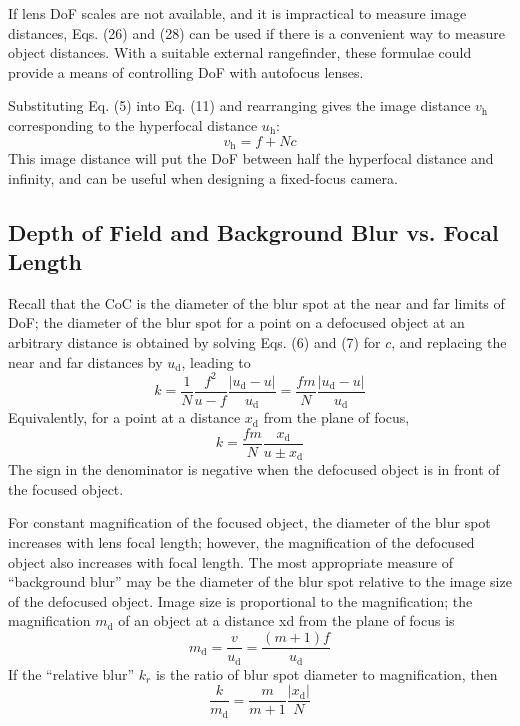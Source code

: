 \documentclass[11pt, oneside]{scrartcl}   	%
\begin{document}
If lens DoF scales are not available, and it is impractical to measure image distances, Eqs. (26) and (28) can be used if there is a convenient way to measure object distances. With a suitable external rangefinder, these formulae could provide a means of controlling DoF with autofocus lenses.

Substituting Eq. (5) into Eq. (11) and rearranging gives the image distance $v_\mathrm{h}$ corresponding to the hyperfocal distance $u_\mathrm{h}$:
\begin{equation}
   v_\mathrm{h} = f + N\!c
   \label{eq:vh} 
\end{equation}
This image distance will put the DoF between half the hyperfocal distance and infinity, and
can be useful when designing a fixed-focus camera.

\subsection{Depth of Field and Background Blur vs. Focal Length}

Recall that the CoC is the diameter of the blur spot at the near and far limits of DoF; the diameter of the blur spot for a point on a defocused object at an arbitrary distance is obtained by solving Eqs. (6) and (7) for $c$, and replacing the near and far distances by $u_\mathrm{d}$, leading to
\begin{equation}
   k = \frac1N \frac{f^2}{u-f}  \frac{|u_\mathrm{d} - u|}{u_\mathrm{d}} = \frac{fm}N \frac{|u_\mathrm{d} - u|}{u_\mathrm{d}}
   \label{eq:k1}
\end{equation}
Equivalently, for a point at a distance $x_\mathrm{d}$ from the plane of focus, 
\begin{equation}
   k = \frac{fm}N \frac{x_\mathrm{d}}{u\pm x_\mathrm{d}}
   \label{eq:k2}
\end{equation}
 The sign in the denominator is negative when the defocused object is in front of the focused object.

For constant magnification of the focused object, the diameter of the blur spot increases with lens focal length; however, the magnification of the defocused object also increases with focal length. The most appropriate measure of “background blur” may be the diameter of the blur spot relative to the image size of the defocused object. Image size is proportional to the magnification; the magnification $m_\mathrm{d}$ of an object at a distance xd from the plane of focus is
\begin{equation}
   m_\mathrm{d} = \frac v {u_\mathrm{d}} = \frac{(m+1)f}{u_\mathrm{d}} 
   \label{eq:md}
\end{equation}
If the “relative blur” $k_r$ is the ratio of blur spot diameter to magnification, then
\begin{equation}
    \frac k{m_\mathrm{d}} = \frac m{m+1}\frac{|x_\mathrm{d}|}N
    \label{eq:km}
\end{equation}
\end{document}
